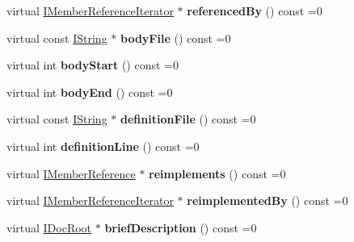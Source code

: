 \begin{DoxyCompactItemize}
\item 
\hypertarget{class_i_member_ace1b899b39b81b3fcc9e99a45acd7c67}{virtual \hyperlink{class_i_member_reference_iterator}{I\-Member\-Reference\-Iterator} $\ast$ {\bfseries referenced\-By} () const =0}\label{class_i_member_ace1b899b39b81b3fcc9e99a45acd7c67}

\item 
\hypertarget{class_i_member_a6920c03ad68066a98e6a6eaf918d8b0a}{virtual const \hyperlink{class_i_string}{I\-String} $\ast$ {\bfseries body\-File} () const =0}\label{class_i_member_a6920c03ad68066a98e6a6eaf918d8b0a}

\item 
\hypertarget{class_i_member_a98336c30f79bed6227dce1de2be7884c}{virtual int {\bfseries body\-Start} () const =0}\label{class_i_member_a98336c30f79bed6227dce1de2be7884c}

\item 
\hypertarget{class_i_member_a7c0447e79b207d4c076a34565111aef6}{virtual int {\bfseries body\-End} () const =0}\label{class_i_member_a7c0447e79b207d4c076a34565111aef6}

\item 
\hypertarget{class_i_member_a918f17fb17e28feaa3101799be8507e5}{virtual const \hyperlink{class_i_string}{I\-String} $\ast$ {\bfseries definition\-File} () const =0}\label{class_i_member_a918f17fb17e28feaa3101799be8507e5}

\item 
\hypertarget{class_i_member_a04795f8087d1d23109456de2519809f7}{virtual int {\bfseries definition\-Line} () const =0}\label{class_i_member_a04795f8087d1d23109456de2519809f7}

\item 
\hypertarget{class_i_member_a8ccd37324cd81d39f99f617162ec6279}{virtual \hyperlink{class_i_member_reference}{I\-Member\-Reference} $\ast$ {\bfseries reimplements} () const =0}\label{class_i_member_a8ccd37324cd81d39f99f617162ec6279}

\item 
\hypertarget{class_i_member_a756204c5017caf98240849bcbfccbc28}{virtual \hyperlink{class_i_member_reference_iterator}{I\-Member\-Reference\-Iterator} $\ast$ {\bfseries reimplemented\-By} () const =0}\label{class_i_member_a756204c5017caf98240849bcbfccbc28}

\item 
\hypertarget{class_i_member_a8a0da25a8851dfb809394c4d6585efb2}{virtual \hyperlink{class_i_doc_root}{I\-Doc\-Root} $\ast$ {\bfseries brief\-Description} () const =0}\label{class_i_member_a8a0da25a8851dfb809394c4d6585efb2}


\end{DoxyCompactItemize}
